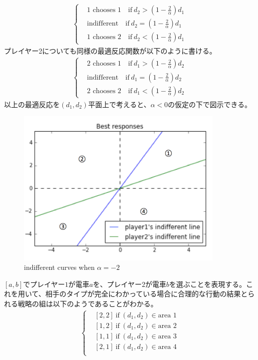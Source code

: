 \documentclass{jsarticle}
\begin{document}
\begin{align*}
	\begin{cases}&\text{1 chooses 1} \quad \text{if}\ d_2 > (1 - \frac{2}{\alpha})d_1\\[8pt]
	&\text{indifferent} \quad \text{if}\ d_2 = (1 - \frac{2}{\alpha})d_1\\[8pt]
	&\text{1 chooses 2} \quad \text{if}\ d_2 < (1 - \frac{2}{\alpha})d_1
	\end{cases}
\end{align*}
プレイヤー2についても同様の最適反応関数が以下のように書ける。
\begin{align*}
	\begin{cases}&\text{2 chooses 1} \quad \text{if}\ d_1> (1 - \frac{2}{\alpha})d_2\\[8pt]
	&\text{indifferent} \quad \text{if}\ d_1 = (1 - \frac{2}{\alpha})d_2\\[8pt]
	&\text{2 chooses 2} \quad \text{if}\ d_1 < (1 - \frac{2}{\alpha})d_2
	\end{cases}
\end{align*}
以上の最適反応を$(d_1, d_2)$平面上で考えると、$\alpha < 0$の仮定の下で図示できる。
\begin{figure}[h]
    \centering
    \includegraphics[width=10cm]{BR.png}
    \caption{indifferent curves when $\alpha = -2$}
\end{figure}
$[a, b]$でプレイヤー$1$が電車$a$を、プレイヤー$2$が電車$b$を選ぶことを表現する。これを用いて、相手のタイプが完全にわかっている場合に合理的な行動の結果とられる戦略の組は以下のようであることがわかる。
\begin{align*}
	\begin{cases}
		&[2, 2]\ \text{if}\ (d_1, d_2) \in \text{area 1}\\[8pt]
		&[1, 2]\ \text{if}\ (d_1, d_2) \in \text{area 2}\\[8pt]
		&[1, 1]\ \text{if}\ (d_1, d_2) \in \text{area 3}\\[8pt]
		&[2, 1]\ \text{if}\ (d_1, d_2) \in \text{area 4}\\[8pt]
	\end{cases}
\end{align*}
\end{document}
